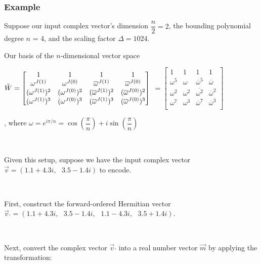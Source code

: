 \subsubsection{Example}
\label{subsubsec:ckks-encoding-ex}


Suppose our input complex vector's dimension $\dfrac{n}{2} = 2$, the bounding polynomial degree $n$ = 4, and the scaling factor $\Delta = 1024$.

Our basis of the $n$-dimensional vector space

$\tilde{W}= \begin{bmatrix}
1 & 1 & 1 & 1\\
\omega^{J(1)} & \omega^{J(0)} & \overline{\omega}^{J(1)} & \overline{\omega}^{J(0)}\\
(\omega^{J(1)})^2 & ({\omega^{J(0)}})^2 & (\overline{\omega}^{J(1)})^2 & (\overline{\omega}^{J(0)})^2\\
(\omega^{J(1)})^3 & (\omega^{J(0)})^3 & (\overline{\omega}^{J(1)})^3 & (\overline{\omega}^{J(0)})^3\\
\end{bmatrix}$
$= \begin{bmatrix}
1 & 1 & 1 & 1\\
\omega^5 & \omega & \overline{\omega}^5 & \overline{\omega}\\
\omega^2 & \omega^2 & \overline{\omega^2} & \overline{\omega}^2\\
\omega^7 & \omega^3 & \overline{\omega}^7 & \overline{\omega}^3\\
\end{bmatrix}$

, where $\omega = e^{i\pi/n} = \cos \left(\dfrac{\pi}{n}\right) + i\sin \left(\dfrac{\pi}{n}\right)$

$ $


Given this setup, suppose we have the input complex vector $\vec{v} = (1.1 + 4.3i, \text{ } 3.5 - 1.4i)$ to encode.

$ $

First, construct the forward-ordered Hermitian vector $\vec{v}_{'} = (1.1 + 4.3i, \text{ } 3.5 - 1.4i, \text{ } 1.1 - 4.3i, \text{ } 3.5 + 1.4i)$.

$ $

Next, convert the complex vector $\vec{v}_{'}$ into a real number vector $\vec{m}$ by applying the transformation:


